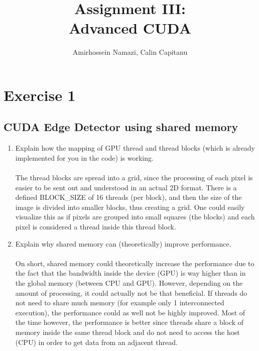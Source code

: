 \documentclass[english]{exam}
\begin{document}
\title{Assignment III:\\ Advanced CUDA}
\author{Amirhossein Namazi, Calin Capitanu}

\maketitle

\chapter{Exercise 1}
\section*{CUDA Edge Detector using shared memory}

\begin{enumerate}
\item Explain how the mapping of GPU thread and thread blocks (which is already implemented for you in the code) is working. \\\\
  The thread blocks are spread into a grid, since the processing of each pixel is easier to be sent out and understood in an actual 2D format. There is a defined BLOCK\_SIZE of 16 threads (per block), and then the size of the image is divided into smaller blocks, thus creating a grid. One could easily visualize this as if pixels are grouped into small squares (the blocks) and each pixel is considered a thread inside this thread block.
  
\item Explain why shared memory can (theoretically) improve performance.\\\\
  On short, shared memory could theoretically increase the performance due to the fact that the bandwidth inside the device (GPU) is way higher than in the global memory (between CPU and GPU). However, depending on the amount of processing, it could actually not be that beneficial. If threads do not need to share much memory (for example only 1 interconnected execution), the performance could as well not be highly improved. Most of the time however, the performance is better since threads share a block of memory inside the same thread block and do not need to access the host (CPU) in order to get data from an adjacent thread.
  

\end{enumerate}
\end{document}
